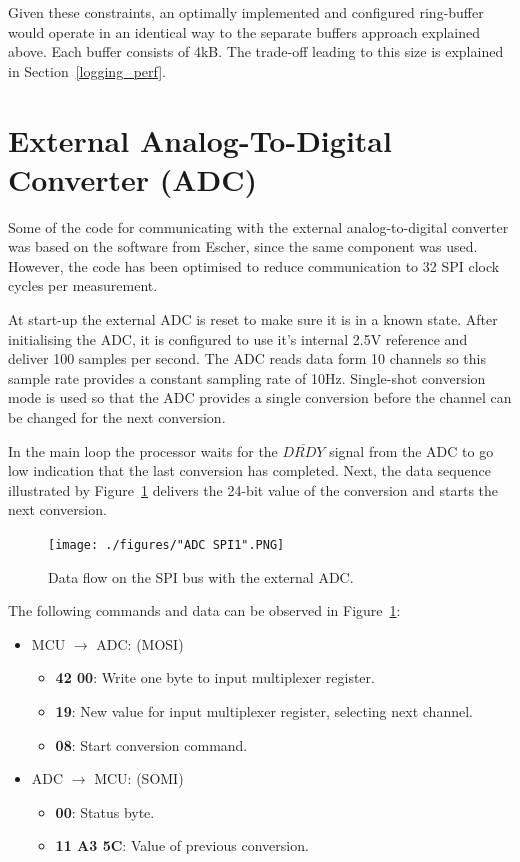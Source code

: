 Given these constraints, an optimally implemented and configured ring-buffer would operate in an identical way to the separate buffers approach explained above. Each buffer consists of 4kB. The trade-off leading to this size is explained in Section~\ref{logging_perf}.

\section{External Analog-To-Digital Converter (ADC)}

Some of the code for communicating with the external analog-to-digital converter was based on the software from Escher, since the same component was used. However, the code has been optimised to reduce communication to 32 SPI clock cycles per measurement.

At start-up the external ADC is reset to make sure it is in a known state. After initialising the ADC, it is configured to use it's internal 2.5V reference and deliver 100 samples per second. The ADC reads data form 10 channels so this sample rate provides a constant sampling rate of 10Hz. Single-shot conversion mode is used so that the ADC provides a single conversion before the channel can be changed for the next conversion.

In the main loop the processor waits for the $\overline{DRDY}$ signal from the ADC to go low indication that the last conversion has completed. Next, the data sequence illustrated by Figure~\ref{fig:adc_spi} delivers the 24-bit value of the conversion and starts the next conversion.

\begin{figure}[H]
    \centering \texttt{[image: ./figures/"ADC SPI1".PNG]}
    \caption{Data flow on the SPI bus with the external ADC.}
    \label{fig:adc_spi}
\end{figure}

The following commands and data can be observed in Figure~\ref{fig:adc_spi}:

\begin{itemize}
    \item MCU $\rightarrow$ ADC: (MOSI)
    \begin{itemize}
        \item \textbf{42 00}: Write one byte to input multiplexer register.
        \item \textbf{19}: New value for input multiplexer register, selecting next channel.
        \item \textbf{08}: Start conversion command.
    \end{itemize}
    \item ADC $\rightarrow$ MCU: (SOMI)
    \begin{itemize}
        \item \textbf{00}: Status byte.
        \item \textbf{11 A3 5C}: Value of previous conversion.
    \end{itemize}
\end{itemize}

